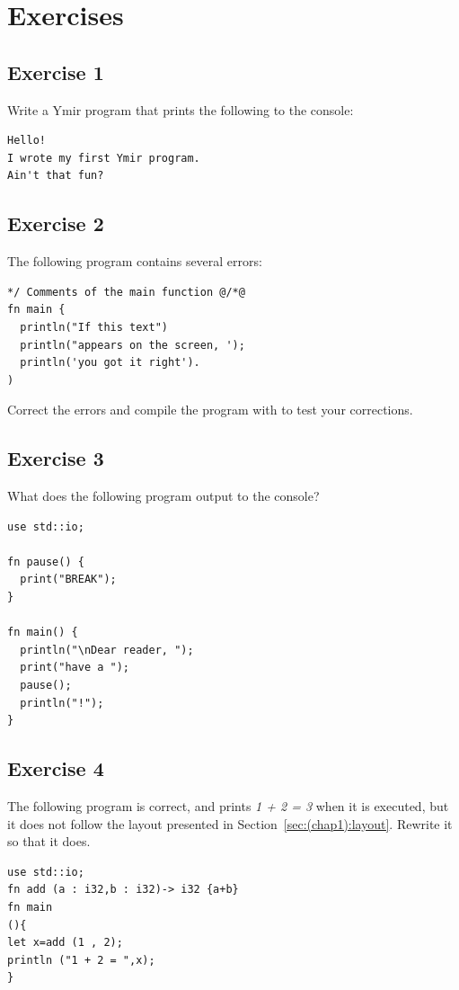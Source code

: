 \section*{Exercises}
%
\subsection*{Exercise 1}

Write a Ymir program that prints the following to the console:
\begin{verbatim}
Hello!
I wrote my first Ymir program.
Ain't that fun?
\end{verbatim}

\subsection*{Exercise 2}
The following program contains several errors:

\begin{lstlisting}[style=coloredverbatimError, escapechar=@, caption=Ymir program with errors]
*/ Comments of the main function @/*@
fn main {
  println("If this text")
  println("appears on the screen, ');
  println('you got it right').
)
\end{lstlisting}
Correct the errors and compile the program with  to test your
corrections.

\subsection*{Exercise 3}

What does the following program output to the console?
\begin{lstlisting}[style=coloredverbatim]
use std::io;

fn pause() {
  print("BREAK");
}

fn main() {
  println("\nDear reader, ");
  print("have a ");
  pause();
  println("!");
}
\end{lstlisting}

\subsection*{Exercise 4}

The following program is correct, and prints \textit{1 + 2 = 3} when it is
executed, but it does not follow the layout presented in
Section~\ref{sec:(chap1):layout}. Rewrite it so that it does.

\begin{lstlisting}[style=coloredverbatim]
use std::io;
fn add (a : i32,b : i32)-> i32 {a+b}
fn main
(){
let x=add (1 , 2);
println ("1 + 2 = ",x);
}
\end{lstlisting}

